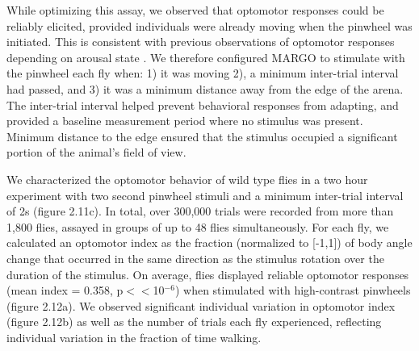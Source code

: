 \documentclass[12pt,letterpaper]{article}
\begin{document}
While optimizing this assay, we observed that optomotor responses could be reliably elicited, provided individuals were already moving when the pinwheel was initiated. This is consistent with previous observations of optomotor responses depending on arousal state \cite{Zhu_Peripheral_2009,Kim_Fly_2016}. We therefore configured MARGO to stimulate with the pinwheel each fly when: 1) it was moving 2), a minimum inter-trial interval had passed, and 3) it was a minimum distance away from the edge of the arena. The inter-trial interval helped prevent behavioral responses from adapting, and provided a baseline measurement period where no stimulus was present. Minimum distance to the edge ensured that the stimulus occupied a significant portion of the animal's field of view. 

We characterized the optomotor behavior of wild type flies in a two hour experiment with two second pinwheel stimuli and a minimum inter-trial interval of 2s (figure 2.11c). In total, over 300,000 trials were recorded from more than 1,800 flies, assayed in groups of up to 48 flies simultaneously. For each fly, we calculated an optomotor index \cite{Seelig_Two_2010} as the fraction (normalized to [-1,1]) of body angle change that occurred in the same direction as the stimulus rotation over the duration of the stimulus. On average, flies displayed reliable optomotor responses (mean index = 0.358, p$<<$10$^{-6}$) when stimulated with high-contrast pinwheels (figure 2.12a). We observed significant individual variation in optomotor index (figure 2.12b) as well as the number of trials each fly experienced, reflecting individual variation in the fraction of time walking. 
\end{document}
